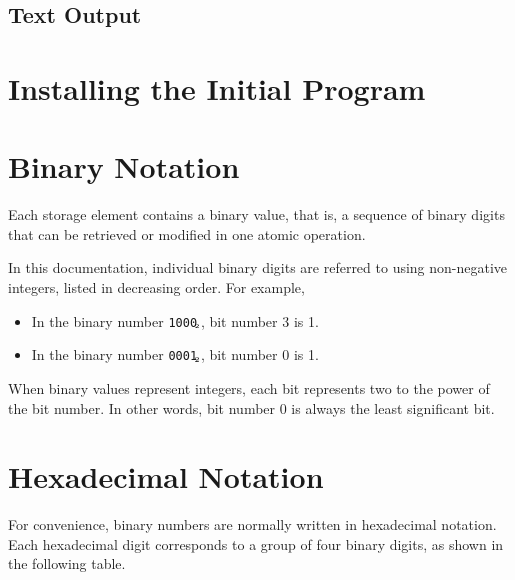 \documentclass[a4paper,11pt]{article}
\newcommand{\num}[1]{\texttt{#1}\xspace}
\newcommand{\bin}[1]{\num{#1}$_{\textup{\tiny\hskip-1ex 2}}$\xspace}
\begin{document}
\subsection{Text Output}

\section{Installing the Initial Program}

\appendix

\section{Binary Notation}
\label{sec:binary-notation}

Each storage element contains a binary value, that is, a sequence of binary digits that can be retrieved or modified in one atomic operation.

In this documentation, individual binary digits are referred to using non-negative integers, listed in decreasing order.  For example,
\begin{itemize}
\item In the binary number \bin{1000}, bit number 3 is 1.
\item In the binary number \bin{0001}, bit number 0 is 1.
\end{itemize}

When binary values represent integers, each bit represents two to the power of the bit number.
In other words, bit number 0 is always the least significant bit.

\section{Hexadecimal Notation}
\label{sec:hexadecimal-notation}

For convenience, binary numbers are normally written in hexadecimal notation.
Each hexadecimal digit corresponds to a group of four binary digits, as shown in the following table.
\end{document}
